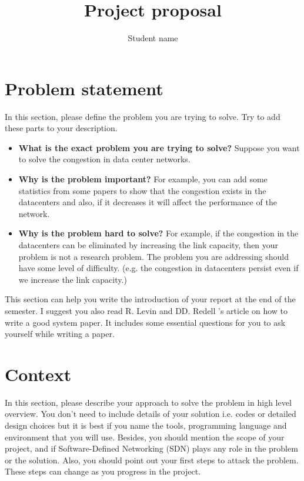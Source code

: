 \documentclass{hotnets23}
\begin{document}


\title{Project proposal}

\author{Student name}

\maketitle

\section*{Problem statement}
In this section, please define the problem you are trying to solve. Try to add these parts to your description.
\begin{itemize}
\item {\textbf{What is the exact problem you are trying to solve?} Suppose you want to solve the congestion in data center networks.}
\item {\textbf{Why is the problem important?} For example, you can add some statistics from some papers to show that the congestion exists in the datacenters and also, if it decreases it will affect the performance of the network.}
\item {\textbf{Why is the problem hard to solve?} For example, if the congestion in the datacenters can be eliminated by increasing the link capacity, then your problem is not a research problem. The problem you are addressing should have some level of difficulty. (e.g. the congestion in datacenters persist even if we increase the link capacity.)}

\end{itemize}

This section can help you write the introduction of your report at the end of the semester. I suggest you also read R. Levin and DD. Redell 's article \cite{writeAgoodPaper} on how to write a good system paper. It includes some essential questions for you to ask yourself while writing a paper.

\section*{Context}
In this section, please describe your approach to solve the problem in high level overview. You don't need to include details of your solution i.e. codes or detailed design choices but it is best if you name the tools, programming language and environment that you will use. Besides, you should mention the scope of your project, and if Software-Defined Networking (SDN) plays any role in the problem or the solution. Also, you should point out your first steps to attack the problem. These steps can change as you progress in the project.
\end{document}

